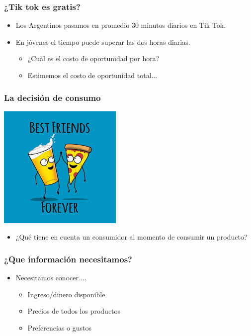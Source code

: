 \documentclass{beamer}
\begin{document}
\begin{frame}
\frametitle{¿Tik tok es gratis?}
\begin{itemize}
    \item Los Argentinos pasamos en promedio 30 minutos diarios en Tik Tok. \vspace{2mm}
    \item En jóvenes el tiempo puede superar las dos horas diarias. \vspace{2mm}
    \begin{itemize}
    \item ¿Cuál es el costo de oportunidad por hora? \vspace{2mm}
    \item Estimemos el costo de oportunidad total...
    \end{itemize}
\end{itemize} 
\end{frame}

\begin{frame}
\frametitle{La decisión de consumo}
\centering
\includegraphics[scale=0.7]{Slides Principios de Economia/Figures/Tema_02.1_pizzabirra.jpg}
\begin{itemize}
\item ¿Qué tiene en cuenta un consumidor al momento de consumir un producto?
\end{itemize}
\end{frame}

\begin{frame}
\frametitle{¿Que información necesitamos?}
\begin{itemize}
\item Necesitamos conocer....
\begin{itemize}
    \item Ingreso/dinero disponible \vspace{2mm}
    \item Precios de todos los productos \vspace{2mm}
    \item Preferencias o gustos
    \end{itemize}
\end{itemize}
\end{frame}
\end{document}

